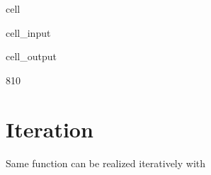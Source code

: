 \documentclass[a4paper,10pt,english]{jupyterBook}
\begin{document}
\begin{sphinxuseclass}{cell}\begin{sphinxVerbatimInput}

\begin{sphinxuseclass}{cell_input}
\begin{sphinxVerbatim}[commandchars=\\\{\}]
\end{sphinxVerbatim}

\end{sphinxuseclass}\end{sphinxVerbatimInput}
\begin{sphinxVerbatimOutput}

\begin{sphinxuseclass}{cell_output}
\begin{sphinxVerbatim}[commandchars=\\\{\}]
810
\end{sphinxVerbatim}

\end{sphinxuseclass}\end{sphinxVerbatimOutput}

\end{sphinxuseclass}

\section{Iteration}
\label{\detokenize{text/progtut/functions:iteration}}
\sphinxAtStartPar
Same function can be realized iteratively with 
\end{document}
